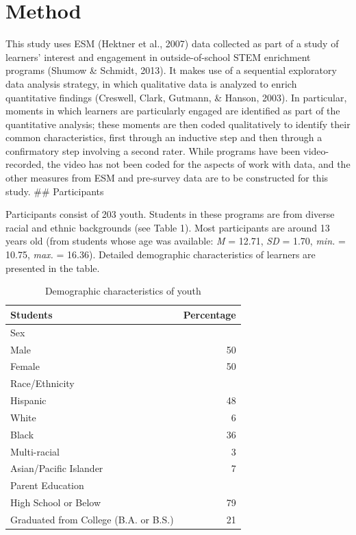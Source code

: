 \documentclass[]{msu-thesis}
\theoremstyle{definition}
\theoremstyle{definition}
\theoremstyle{definition}
\theoremstyle{remark}
\begin{document}
\chapter{Method}\label{method}

This study uses ESM (Hektner et al., 2007) data collected as part of a
study of learners' interest and engagement in outside-of-school STEM
enrichment programs (Shumow \& Schmidt, 2013). It makes use of a
sequential exploratory data analysis strategy, in which qualitative data
is analyzed to enrich quantitative findings (Creswell, Clark, Gutmann,
\& Hanson, 2003). In particular, moments in which learners are
particularly engaged are identified as part of the quantitative
analysis; these moments are then coded qualitatively to identify their
common characteristics, first through an inductive step and then through
a confirmatory step involving a second rater. While programs have been
video-recorded, the video has not been coded for the aspects of work
with data, and the other measures from ESM and pre-survey data are to be
constructed for this study. \#\# Participants

Participants consist of 203 youth. Students in these programs are from
diverse racial and ethnic backgrounds (see Table 1). Most participants
are around 13 years old (from students whose age was available: \emph{M}
= 12.71, \emph{SD} = 1.70, \emph{min.} = 10.75, \emph{max.} = 16.36).
Detailed demographic characteristics of learners are presented in the
table.

\begin{table}

\caption{\label{tab:unnamed-chunk-4}Demographic characteristics of youth}
\centering
\begin{tabular}[t]{lr}
\toprule
Students & Percentage\\
\midrule
Sex & \\
Male & 50\\
Female & 50\\
Race/Ethnicity & \\
Hispanic & 48\\
\addlinespace
White & 6\\
Black & 36\\
Multi-racial & 3\\
Asian/Pacific Islander & 7\\
Parent Education & \\
\addlinespace
High School or Below & 79\\
Graduated from College (B.A. or B.S.) & 21\\
\bottomrule
\end{tabular}
\end{table}
\end{document}
